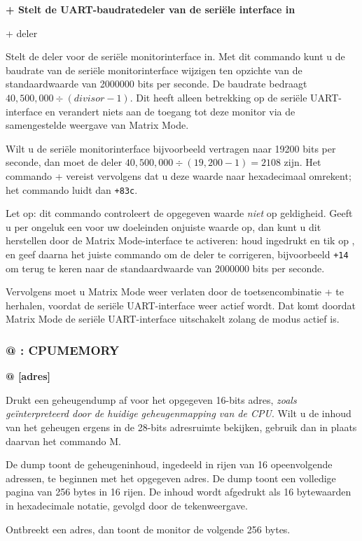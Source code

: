 \begin{description}[leftmargin=2cm,style=nextline]
\item [Formaat:] {\bf + Stelt de UART-baudratedeler van de seriële interface in}\item [Gebruik:] + deler

\item [Opmerkingen:] Stelt de deler voor de seriële monitorinterface in. Met dit commando kunt u de baudrate van de seriële monitorinterface wijzigen ten opzichte van de standaardwaarde van 2000000 bits per seconde. De baudrate bedraagt $40,500,000 \div (divisor-1)$. Dit heeft alleen betrekking op de seriële UART-interface en verandert niets aan de toegang tot deze monitor via de samengestelde weergave van Matrix Mode.

  Wilt u de seriële monitorinterface bijvoorbeeld vertragen naar 19200 bits per seconde, dan moet de deler $40,500,000 \div (19,200 - 1) = 2108$ zijn. Het commando + vereist vervolgens dat u deze waarde naar hexadecimaal omrekent; het commando luidt dan {\tt +83c}.

  Let op: dit commando controleert de opgegeven waarde {\em niet} op geldigheid. Geeft u per ongeluk een voor uw doeleinden onjuiste waarde op, dan kunt u dit herstellen door de Matrix Mode-interface te activeren: houd \megasymbolkey ingedrukt en tik op , en geef daarna het juiste commando om de deler te corrigeren, bijvoorbeeld {\tt +14} om terug te keren naar de standaardwaarde van 2000000 bits per seconde.

  Vervolgens moet u Matrix Mode weer verlaten door de toetsencombinatie \megasymbolkey +  te herhalen, voordat de seriële UART-interface weer actief wordt. Dat komt doordat Matrix Mode de seriële UART-interface uitschakelt zolang de modus actief is.
\end{description}

\subsubsection{@ : CPUMEMORY}
\begin{description}[leftmargin=2cm,style=nextline]
\item [Formaat:] {\bf @ [adres]}\item [Gebruik:] Drukt een geheugendump af voor het opgegeven 16-bits adres, {\em zoals geïnterpreteerd door de huidige geheugenmapping van de CPU}. Wilt u de inhoud van het geheugen ergens in de 28-bits adresruimte bekijken, gebruik dan in plaats daarvan het commando M.

  De dump toont de geheugeninhoud, ingedeeld in rijen van 16 opeenvolgende adressen, te beginnen met het opgegeven adres. De dump toont een volledige pagina van 256 bytes in 16 rijen. De inhoud wordt afgedrukt als 16 bytewaarden in hexadecimale notatie, gevolgd door de tekenweergave.

\item [Opmerkingen:] Ontbreekt een adres, dan toont de monitor de volgende 256 bytes.

\end{description}

